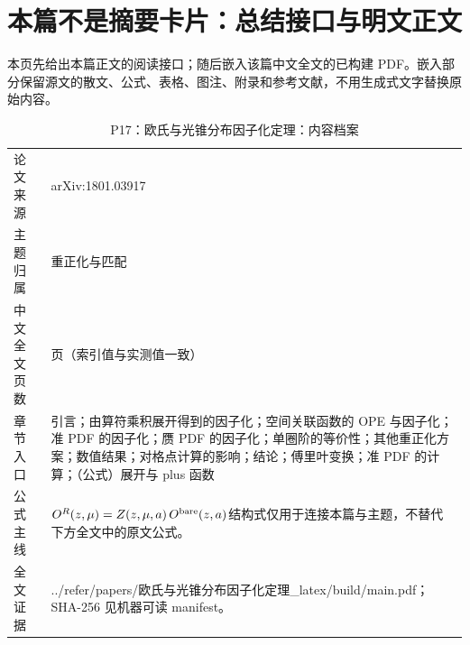 \documentclass[UTF8,11pt,oneside]{ctexbook}
\begin{document}
\section*{本篇不是摘要卡片：总结接口与明文正文}
本页先给出本篇正文的阅读接口；随后嵌入该篇中文全文的已构建 PDF。嵌入部分保留源文的散文、公式、表格、图注、附录和参考文献，不用生成式文字替换原始内容。
\begin{table}[htbp]
  \centering
  \caption{P17：欧氏与光锥分布因子化定理：内容档案}
  \small
  \begin{tabularx}{0.96\textwidth}{@{}p{3.3cm}>{\raggedright\arraybackslash}X@{}}
    \toprule
    论文来源 & arXiv:1801.03917 \\
    主题归属 & 重正化与匹配 \\
    中文全文页数 & 28 页（索引值与实测值一致） \\
    章节入口 & 引言；由算符乘积展开得到的因子化；空间关联函数的 OPE 与因子化；准 PDF 的因子化；赝 PDF 的因子化；单圈阶的等价性；其他重正化方案；数值结果；对格点计算的影响；结论；傅里叶变换；准 PDF 的计算；（公式）展开与 plus 函数 \\
    公式主线 & $O^{R}(z,\mu)=Z(z,\mu,a)\,O^{\rm bare}(z,a)$\newline\scriptsize 结构式仅用于连接本篇与主题，不替代下方全文中的原文公式。 \\
    全文证据 & ../\allowbreak{}refer/\allowbreak{}papers/\allowbreak{}欧氏与光锥分布因子化定理\_\allowbreak{}latex/\allowbreak{}build/\allowbreak{}main.pdf；SHA-256 见机器可读 manifest。 \\
    \bottomrule
  \end{tabularx}
\end{table}
\end{document}
